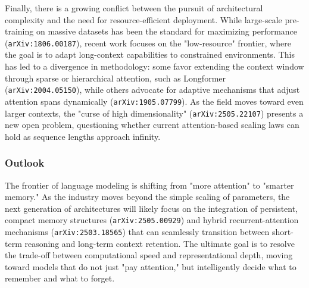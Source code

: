 \documentclass[11pt]{article}
\begin{document}
Finally, there is a growing conflict between the pursuit of architectural complexity and the need for resource-efficient deployment. While large-scale pre-training on massive datasets has been the standard for maximizing performance (\texttt{arXiv:1806.00187}), recent work focuses on the "low-resource" frontier, where the goal is to adapt long-context capabilities to constrained environments. This has led to a divergence in methodology: some favor extending the context window through sparse or hierarchical attention, such as Longformer (\texttt{arXiv:2004.05150}), while others advocate for adaptive mechanisms that adjust attention spans dynamically (\texttt{arXiv:1905.07799}). As the field moves toward even larger contexts, the "curse of high dimensionality" (\texttt{arXiv:2505.22107}) presents a new open problem, questioning whether current attention-based scaling laws can hold as sequence lengths approach infinity.

\subsubsection{Outlook}

The frontier of language modeling is shifting from "more attention" to "smarter memory." As the industry moves beyond the simple scaling of parameters, the next generation of architectures will likely focus on the integration of persistent, compact memory structures (\texttt{arXiv:2505.00929}) and hybrid recurrent-attention mechanisms (\texttt{arXiv:2503.18565}) that can seamlessly transition between short-term reasoning and long-term context retention. The ultimate goal is to resolve the trade-off between computational speed and representational depth, moving toward models that do not just "pay attention," but intelligently decide what to remember and what to forget.
\end{document}
